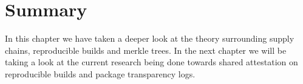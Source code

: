 \documentclass[../Main/thesis.tex]{subfiles}
\begin{document}
\section*{Summary}\label{sec:summary-technologies} 
In this chapter we have taken a deeper look at the theory surrounding supply
chains, reproducible builds and merkle trees. In the next chapter we will be
taking a look at the current research being done towards shared attestation on
reproducible builds and package transparency logs.

\blankpage
\end{document}
